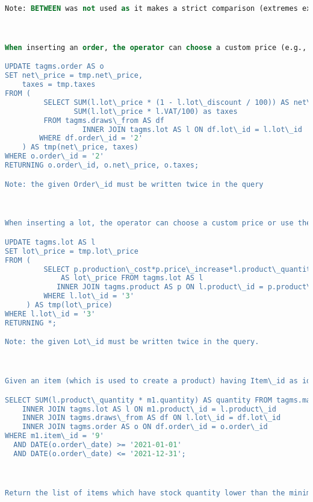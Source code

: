 \begin{lstlisting}[language=SQL,
keywordstyle=\color{blue},
stringstyle=\color{mauve},
showstringspaces=false,
basicstyle=\ttfamily\footnotesize]
Note: BETWEEN was not used as it makes a strict comparison (extremes excluded).



When inserting an order, the operator can choose a custom price (e.g., decided with the customer) or use the following query. Given an order with Order\_id, compute the order's net\_price and total taxes.

UPDATE tagms.order AS o
SET net\_price = tmp.net\_price,
    taxes = tmp.taxes
FROM (
         SELECT SUM(l.lot\_price * (1 - l.lot\_discount / 100)) AS net\_price,
                SUM(l.lot\_price * l.VAT/100) as taxes
         FROM tagms.draws\_from AS df
                  INNER JOIN tagms.lot AS l ON df.lot\_id = l.lot\_id
        WHERE df.order\_id = '2'
    ) AS tmp(net\_price, taxes)
WHERE o.order\_id = '2'
RETURNING o.order\_id, o.net\_price, o.taxes;

Note: the given Order\_id must be written twice in the query



When inserting a lot, the operator can choose a custom price or use the following query. Given a lot with Lot\_id, compute the lot price.

UPDATE tagms.lot AS l
SET lot\_price = tmp.lot\_price
FROM (
         SELECT p.production\_cost*p.price\_increase*l.product\_quantity
             AS lot\_price FROM tagms.lot AS l
            INNER JOIN tagms.product AS p ON l.product\_id = p.product\_id
         WHERE l.lot\_id = '3'
     ) AS tmp(lot\_price)
WHERE l.lot\_id = '3'
RETURNING *;

Note: the given Lot\_id must be written twice in the query.



Given an item (which is used to create a product) having Item\_id as identifier and a time interval (actually, two dates), find the total quantity of that item that has been used for production or packaging during that time.

SELECT SUM(l.product\_quantity * m1.quantity) AS quantity FROM tagms.made\_up\_of\_1 AS m1
    INNER JOIN tagms.lot AS l ON m1.product\_id = l.product\_id
    INNER JOIN tagms.draws\_from AS df ON l.lot\_id = df.lot\_id
    INNER JOIN tagms.order AS o ON df.order\_id = o.order\_id
WHERE m1.item\_id = '9'
  AND DATE(o.order\_date) >= '2021-01-01'
  AND DATE(o.order\_date) <= '2021-12-31';



Return the list of items which have stock quantity lower than the minimum one.


\end{lstlisting}
